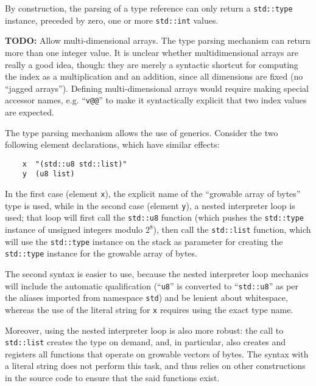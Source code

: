 By construction, the parsing of a type reference can only return a
\verb|std::type| instance, preceded by zero, one or more \verb|std::int|
values.

\begin{rationale}
\textsf{\textbf{TODO:}} Allow multi-dimensional arrays. The type parsing
mechanism can return more than one integer value. It is unclear whether
multidimensional arrays are really a good idea, though: they are merely
a syntactic shortcut for computing the index as a multiplication and an
addition, since all dimensions are fixed (no ``jagged arrays''). Defining
multi-dimensional arrays would require making special accessor names,
e.g. ``\verb|v@@|'' to make it syntactically explicit that two index
values are expected.
\end{rationale}

\begin{rationale}
The type parsing mechanism allows the use of generics. Consider the
two following element declarations, which have similar effects:
\begin{verbatim}
    x  "(std::u8 std::list)"
    y  (u8 list)
\end{verbatim}
In the first case (element \verb|x|), the explicit name of the
``growable array of bytes'' type is used, while in the second case
(element \verb|y|), a nested interpreter loop is used; that loop will
first call the \verb|std::u8| function (which pushes the
\verb|std::type| instance of unsigned integers modulo $2^8$), then call
the \verb|std::list| function, which will use the \verb|std::type|
instance on the stack as parameter for creating the \verb|std::type|
instance for the growable array of bytes.

The second syntax is easier to use, because the nested interpreter loop
mechanics will include the automatic qualification (``\verb|u8|'' is
converted to ``\verb|std::u8|'' as per the aliases imported from
namespace \verb|std|) and be lenient about whitespace, whereas the use
of the literal string for \verb|x| requires using the exact type name.

Moreover, using the nested interpreter loop is also more robust: the
call to \verb|std::list| creates the type on demand, and, in particular,
also creates and registers all functions that operate on growable
vectors of bytes. The syntax with a literal string does not perform
this task, and thus relies on other constructions in the source code to
ensure that the said functions exist.
\end{rationale}

